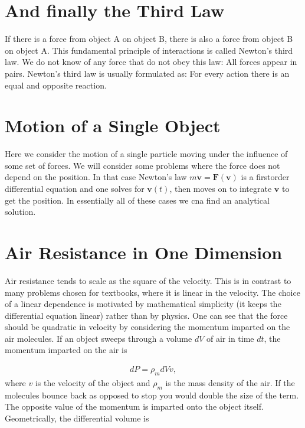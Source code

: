 \documentclass[letterpaper,10pt,english]{sphinxmanual}
\begin{document}
\section{And finally the Third Law}
\label{\detokenize{chapter1:and-finally-the-third-law}}
If there is a force from object A on object B, there is also a force from object B on object A.
This fundamental principle of interactions is called Newton’s third law. We do not
know of any force that do not obey this law: All forces appear in pairs. Newton’s
third law is usually formulated as: For every action there is an equal and opposite
reaction.


\section{Motion of a Single Object}
\label{\detokenize{chapter1:motion-of-a-single-object}}
Here we consider the motion of a single particle moving under
the influence of some set of forces.  We will consider some problems where
the force does not depend on the position. In that case Newton’s law
\(m\dot{\boldsymbol{v}}=\boldsymbol{F}(\boldsymbol{v})\) is a first\sphinxhyphen{}order differential
equation and one solves for \(\boldsymbol{v}(t)\), then moves on to integrate
\(\boldsymbol{v}\) to get the position. In essentially all of these cases we cna find an analytical solution.


\section{Air Resistance in One Dimension}
\label{\detokenize{chapter1:air-resistance-in-one-dimension}}
Air resistance tends to scale as the square of the velocity. This is
in contrast to many problems chosen for textbooks, where it is linear
in the velocity. The choice of a linear dependence is motivated by
mathematical simplicity (it keeps the differential equation linear)
rather than by physics. One can see that the force should be quadratic
in velocity by considering the momentum imparted on the air
molecules. If an object sweeps through a volume \(dV\) of air in time
\(dt\), the momentum imparted on the air is




\begin{equation*}
\begin{split}
\begin{equation}
dP=\rho_m dV v,
\label{_auto1} \tag{1}
\end{equation}
\end{split}
\end{equation*}
where \(v\) is the velocity of the object and \(\rho_m\) is the mass
density of the air. If the molecules bounce back as opposed to stop
you would double the size of the term. The opposite value of the
momentum is imparted onto the object itself. Geometrically, the
differential volume is
\end{document}
